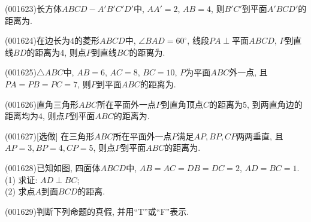 \item (001623)长方体$ABCD-A'B'C'D'$中, $AA'=2$, $AB=4$, 则$B'C'$到平面$A'BCD'$的距离为.
\item (001624)在边长为$4$的菱形$ABCD$中, $\angle BAD=60^\circ$, 线段$PA\perp$平面$ABCD$, $P$到直线$BD$的距离为$4$, 则点$P$到直线$BC$的距离为.
\item (001625)$\triangle ABC$中, $AB=6$, $AC=8$, $BC=10$, $P$为平面$ABC$外一点, 且$PA=PB=PC=7$, 则$P$到平面$ABC$的距离为.
\item (001626)直角三角形$ABC$所在平面外一点$P$到直角顶点$C$的距离为$5$, 到两直角边的距离均为$4$, 则点$P$到平面$ABC$的距离为.
\item (001627)[选做]
在三角形$ABC$所在平面外一点$P$满足$AP,BP,CP$两两垂直,
且$AP=3,BP=4,CP=5$, 则点$P$到平面$ABC$的距离为.
\item (001628)已知如图, 四面体$ABCD$中, $AB=AC=DB=DC=2$, $AD=BC=1$.\\ 
(1) 求证: $AD\perp BC$;\\ 
(2) 求点$A$到面$BCD$的距离.
\begin{center}
\end{center}
\item (001629)判断下列命题的真假, 并用``{\rm T}''或``{\rm F}''表示.\\ 
